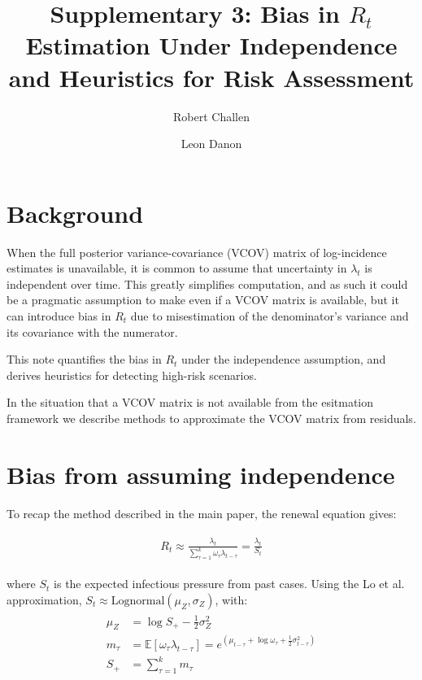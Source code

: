 \documentclass[a4paper, 12pt, twoside]{article}
\title{Supplementary 3: Bias in $ R_t $ Estimation Under Independence and Heuristics for Risk Assessment}
\author[1,2]{Robert Challen}
\author[1,2]{Leon Danon}
\affil[1]{AI4CI, University of Bristol, Bristol, UK.}
\affil[2]{Department of Engineering Mathematics, University of Bristol, Bristol, UK.}
\date{}                     %
\let\Oldsection\section
\renewcommand{\section}{\FloatBarrier\Oldsection}
\begin{document}
\maketitle

\section{Background}

When the full posterior variance-covariance (VCOV) matrix of log-incidence estimates is unavailable, it is common to assume that uncertainty in $ \lambda_t $ is independent over time. This greatly simplifies computation, and as such it could be a pragmatic assumption to make even if a VCOV matrix is available, but it can introduce bias in $ R_t $ due to misestimation of the denominator’s variance and its covariance with the numerator.

This note quantifies the bias in $ R_t $ under the independence assumption, and derives heuristics for detecting high-risk scenarios.

In the situation that a VCOV matrix is not available from the esitmation framework we describe methods to approximate the VCOV matrix from residuals.

\section{Bias from assuming independence}

To recap the method described in the main paper, the renewal equation gives:

\begin{eqnarray}
\begin{aligned}
R_t \approx \frac{\lambda_t}{\sum_{\tau=1}^k \omega_\tau \lambda_{t-\tau}} = \frac{\lambda_t}{S_t}
\end{aligned}
\end{eqnarray}

where $ S_t $ is the expected infectious pressure from past cases. Using the Lo et al. \cite{lo2013} approximation, $ S_t \approx \text{Lognormal}(\mu_Z, \sigma_Z) $, with:
\begin{eqnarray}
\begin{aligned}
\mu_Z &= \log S_+ - \frac{1}{2} \sigma_Z^2 \\
m_\tau &= \mathbb{E}[\omega_\tau \lambda_{t-\tau}] = e^{\left( \mu_{t-\tau} + \log \omega_\tau + \frac{1}{2} \sigma_{t-\tau}^2 \right)} \\
S_+ &= \sum_{\tau=1}^k m_\tau \\
\end{aligned}
\end{eqnarray}
\end{document}
